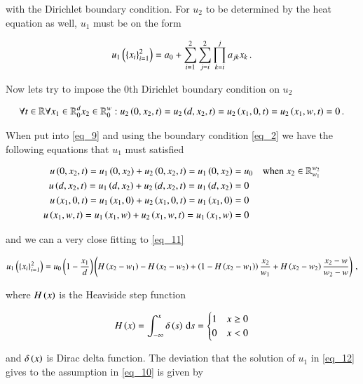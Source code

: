 \documentclass[11pt,english,a4paper]{article}
\begin{document}
\begin{flushleft}
with the Dirichlet boundary condition. For $u_2$ to be determined by the heat equation as well, $u_1$ must be on the form

\begin{align}
u_1\left({\left\lbrace{x_i}\right\rbrace_{i=1}^2}\right) = a_0 + \sum_{i=1}^2\sum_{j=i}^2\prod_{k=i}^j a_{jk} x_k \,.
\label{eq_11}
\end{align}

Now lets try to impose the 0th Dirichlet boundary condition on $u_2$

\begin{align}
\forall t \in \mathbb{R} \forall x_1 \in \mathbb{R}_0^d x_2 \in \mathbb{R}_0^w : u_2\left({0,x_2,t}\right)=u_2\left({d,x_2,t}\right)=u_2\left({x_1,0,t}\right)=u_2\left({x_1,w,t}\right)=0\,.
\label{eq_12}
\end{align}

When put into \eqref{eq_9} and using the boundary condition \eqref{eq_2} we have the following equations that $u_1$ must satisfied

\begin{align*}
u\left({0,x_2,t}\right) = u_1\left({0,x_2}\right) + u_2\left({0,x_2,t}\right) = u_1\left({0,x_2}\right) &= u_0 \quad \text{when } x_2\in\mathbb{R}_{w_1}^{w_2} 
\\
u\left({d,x_2,t}\right) = u_1\left({d,x_2}\right) + u_2\left({d,x_2,t}\right) = u_1\left({d,x_2}\right) &= 0
\\
u\left({x_1,0,t}\right) = u_1\left({x_1,0}\right) + u_2\left({x_1,0,t}\right) = u_1\left({x_1,0}\right) &= 0
\\
u\left({x_1,w,t}\right) = u_1\left({x_1,w}\right) + u_2\left({x_1,w,t}\right) = u_1\left({x_1,w}\right) &= 0
\end{align*}

and we can a very close fitting to \eqref{eq_11} 

\begin{align}
u_1\left({\left\lbrace{x_i}\right\rbrace_{i=1}^2}\right) = u_0\left({1-\frac{x_1}{d}}\right)\left({H\left({x_2-w_1}\right)-H\left({x_2-w_2}\right) + \left({1-H\left({x_2-w_1}\right)}\right)\frac{x_2}{w_1} + H\left({x_2-w_2}\right)\frac{x_2-w}{w_2-w}}\right) \,,
\label{eq_12}
\end{align}

where $H\left({x}\right)$ is the Heaviside step function

\begin{align*}
H\left({x}\right) = \int_{-\infty}^x \delta\left({s}\right)\,\mathrm{d}s = \begin{cases} 1 & x \geq 0 \\ 0 & x < 0 \end{cases}
\end{align*}

and $\delta\left({x}\right)$ is Dirac delta function. The deviation that the solution of $u_1$ in \eqref{eq_12} gives to the assumption in \eqref{eq_10} is given by


\end{flushleft}
\end{document}

